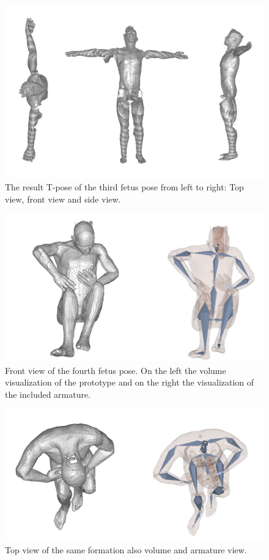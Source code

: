 \begin{figure} [htb!]
    \centering
	\includegraphics[width=15cm]{content/images/results/man3Result.png}
	\caption{The result T-pose of the third fetus pose from left to right: Top view, front view and side view.}
	\label{fig:}
\end{figure}
\newpage
\begin{figure} [htb!]
    \centering
	\includegraphics[width=13cm]{content/images/results/man4Front.png}
	\caption{Front view of the fourth fetus pose. On the left the volume visualization of the prototype and on the right the visualization of the included armature.}
	\label{fig:}
\end{figure}
\begin{figure} [htb!]
    \centering
	\includegraphics[width=13cm]{content/images/results/man4Top.png}
	\caption{Top view of the same formation also volume and armature view.}
	\label{fig:}
\end{figure}

